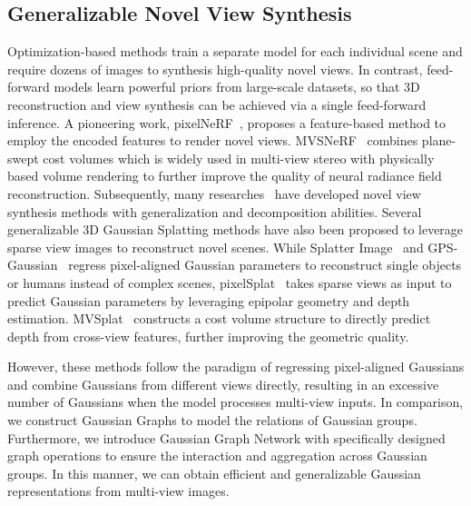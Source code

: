 \subsection{Generalizable Novel View Synthesis}
Optimization-based methods train a separate model for each individual scene and require dozens of images to synthesis high-quality novel views. In contrast, feed-forward
models learn powerful priors from large-scale datasets, so that
3D reconstruction and view synthesis can be achieved via a single feed-forward inference. A pioneering work, pixelNeRF~\cite{pixelNeRF2021CVPR}, proposes a feature-based method to employ the encoded features to render novel views. MVSNeRF~\cite{chen2021mvsnerf} combines plane-swept cost volumes which is widely used in multi-view stereo with physically based volume rendering to further improve the quality of neural radiance field reconstruction. Subsequently, many researches~\cite{cai2022pix2nerf, chan2021pi, gu2021stylenerf, jang2021codenerf, niemeyer2021giraffe, schwarz2020graf, liu2023semantic} have developed novel view synthesis methods with generalization and decomposition abilities.
Several generalizable 3D Gaussian Splatting methods have also been proposed to leverage sparse view images to reconstruct novel scenes.  
While Splatter Image~\cite{SplatterImage2023arXiv} and GPS-Gaussian~\cite{GPSGaussian2023arXiv} regress pixel-aligned Gaussian parameters to reconstruct single objects or humans instead of complex scenes,
pixelSplat~\cite{pixelSplat2023arXiv} takes sparse views as input to predict Gaussian parameters by leveraging epipolar geometry and depth estimation. 
MVSplat~\cite{MVSplat2024arXiv} constructs a cost volume structure to directly predict depth from cross-view features, further improving the geometric quality.

However, these methods follow the paradigm of regressing pixel-aligned Gaussians and combine Gaussians from different views directly, resulting in an excessive number of Gaussians when the model processes multi-view inputs. 
In comparison, we construct Gaussian Graphs to model the relations of Gaussian groups. Furthermore, we introduce Gaussian Graph Network with specifically designed graph operations to ensure the interaction and aggregation across Gaussian groups. In this manner, we can obtain efficient and generalizable Gaussian representations from multi-view images.


